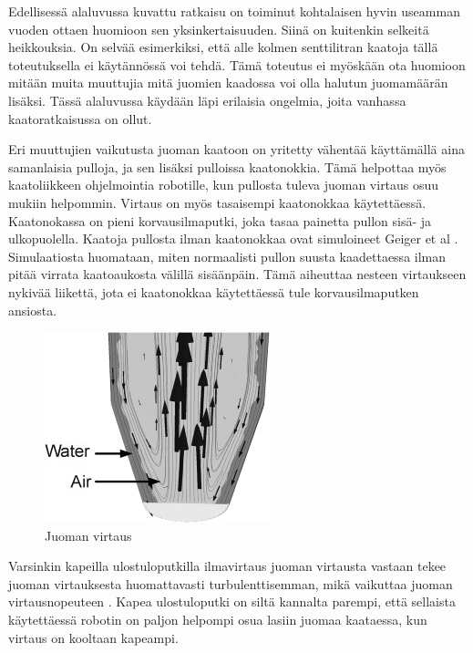 Edellisessä alaluvussa kuvattu ratkaisu on toiminut kohtalaisen hyvin useamman vuoden ottaen huomioon sen yksinkertaisuuden. Siinä on kuitenkin selkeitä heikkouksia. On selvää esimerkiksi, että alle kolmen senttilitran kaatoja tällä toteutuksella ei käytännössä voi tehdä. Tämä toteutus ei myöskään ota huomioon mitään muita muuttujia mitä juomien kaadossa voi olla halutun juomamäärän lisäksi. Tässä alaluvussa käydään läpi erilaisia ongelmia, joita vanhassa kaatoratkaisussa on ollut.

Eri muuttujien vaikutusta juoman kaatoon on yritetty vähentää käyttämällä aina samanlaisia pulloja, ja sen lisäksi pulloissa kaatonokkia. Tämä helpottaa myös kaatoliikkeen ohjelmointia robotille, kun pullosta tuleva juoman virtaus osuu mukiin helpommin. Virtaus on myös tasaisempi kaatonokkaa käytettäessä. Kaatonokassa on pieni korvausilmaputki, joka tasaa painetta pullon sisä- ja ulkopuolella. Kaatoja pullosta ilman kaatonokkaa ovat simuloineet Geiger et al \cite{Geiger2012}. Simulaatiosta huomataan, miten normaalisti pullon suusta kaadettaessa ilman pitää virrata kaatoaukosta välillä sisäänpäin. Tämä aiheuttaa nesteen virtaukseen nykivää liikettä, jota ei kaatonokkaa käytettäessä tule korvausilmaputken ansiosta.

\begin{figure}[h]
\begin{center}
\includegraphics[scale=1.1]{img/Geiger et al. juoman virtaus.jpg}
\end{center}
\caption{Juoman virtaus \cite{Geiger2012}}
\label{fig:juomien_virtaus}
\end{figure}

Varsinkin kapeilla ulostuloputkilla ilmavirtaus juoman virtausta vastaan tekee juoman virtauksesta huomattavasti turbulenttisemman, mikä vaikuttaa juoman virtausnopeuteen \cite{Geiger2012}. Kapea ulostuloputki on siltä kannalta parempi, että sellaista käytettäessä robotin on paljon helpompi osua lasiin juomaa kaataessa, kun virtaus on kooltaan kapeampi.

